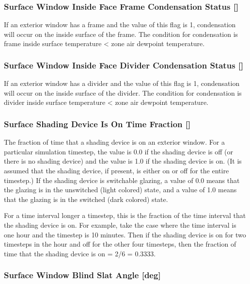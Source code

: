 \subsubsection{Surface Window Inside Face Frame Condensation Status {[]}}\label{surface-window-inside-face-frame-condensation-status}

If an exterior window has a frame and the value of this flag is 1, condensation will occur on the inside surface of the frame. The condition for condensation is frame inside surface temperature \textless{} zone air dewpoint temperature.

\subsubsection{Surface Window Inside Face Divider Condensation Status {[]}}\label{surface-window-inside-face-divider-condensation-status}

If an exterior window has a divider and the value of this flag is 1, condensation will occur on the inside surface of the divider. The condition for condensation is divider inside surface temperature \textless{} zone air dewpoint temperature.

\subsubsection{Surface Shading Device Is On Time Fraction {[]}}\label{surface-shading-device-is-on-time-fraction}

The fraction of time that a shading device is on an exterior window. For a particular simulation timestep, the value is 0.0 if the shading device is off (or there is no shading device) and the value is 1.0 if the shading device is on. (It is assumed that the shading device, if present, is either on or off for the entire timestep.) If the shading device is switchable glazing, a value of 0.0 means that the glazing is in the unswitched (light colored) state, and a value of 1.0 means that the glazing is in the switched (dark colored) state.

For a time interval longer a timestep, this is the fraction of the time interval that the shading device is on. For example, take the case where the time interval is one hour and the timestep is 10 minutes. Then if the shading device is on for two timesteps in the hour and off for the other four timesteps, then the fraction of time that the shading device is on = 2/6 = 0.3333.

\subsubsection{Surface Window Blind Slat Angle {[}deg{]}}\label{surface-window-blind-slat-angle-deg}

